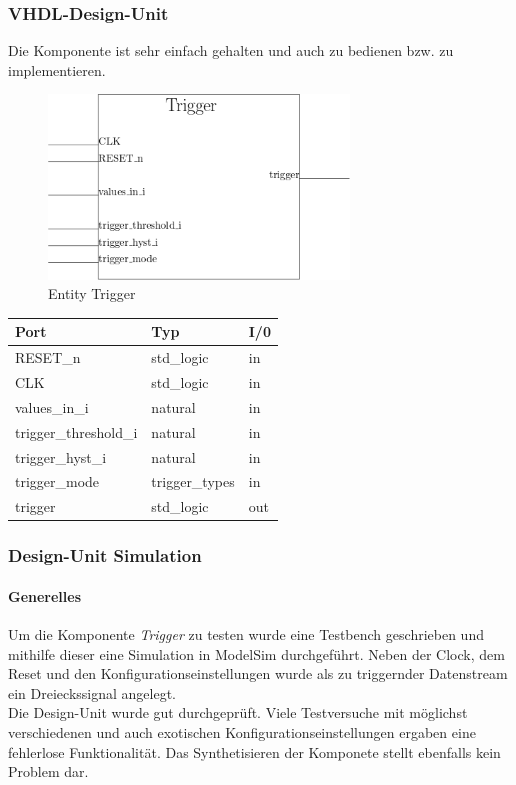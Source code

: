 \subsubsection{VHDL-Design-Unit}
Die Komponente ist sehr einfach gehalten und auch zu bedienen bzw. zu implementieren.

\begin{figure}[!h]
	\begin{center}
		\includegraphics[width=8cm]{SAUER/Grafiken/Trigger/Block.png}
		\caption{Entity Trigger}
	\end{center}
\end{figure}
\begin{center}
\begin{tabular}[h]{|l|l|l|}
	\hline
	Port & Typ & I/0\\
	\hline\hline
	RESET\_n & std\_logic & in\\
	\hline
	CLK & std\_logic & in\\
	\hline
	values\_in\_i & natural & in\\
	\hline
	trigger\_threshold\_i & natural & in\\
	\hline
	trigger\_hyst\_i & natural & in\\
	\hline
	trigger\_mode & trigger\_types & in\\
	\hline
	trigger & std\_logic & out\\
	\hline
\end{tabular}
\end{center}
\subsubsection{Design-Unit Simulation}
\paragraph{Generelles}
Um die Komponente \textit{Trigger} zu testen wurde eine Testbench geschrieben und mithilfe dieser eine Simulation in ModelSim durchgeführt. Neben der Clock, dem Reset und den Konfigurationseinstellungen wurde als zu triggernder Datenstream ein Dreieckssignal angelegt.
\\Die Design-Unit wurde gut durchgeprüft. Viele Testversuche mit möglichst verschiedenen und auch exotischen Konfigurationseinstellungen ergaben eine fehlerlose Funktionalität. Das Synthetisieren der Komponete stellt ebenfalls kein Problem dar.

